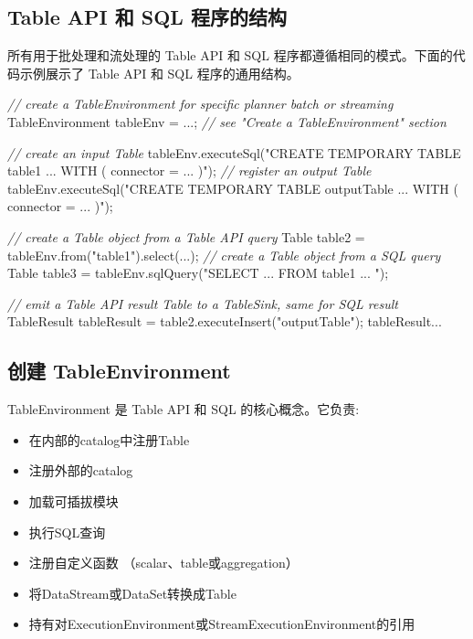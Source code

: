 \documentclass[cn,11pt,chinese]{elegantbook}
\newenvironment{Shaded}{}{}
\newcommand{\CommentTok}[1]{\textcolor[rgb]{0.38,0.63,0.69}{\textit{#1}}}
\newcommand{\FunctionTok}[1]{\textcolor[rgb]{0.02,0.16,0.49}{#1}}
\newcommand{\NormalTok}[1]{#1}
\newcommand{\StringTok}[1]{\textcolor[rgb]{0.25,0.44,0.63}{#1}}
\providecommand{\tightlist}{%
  \setlength{\itemsep}{0pt}\setlength{\parskip}{0pt}}
\begin{document}
\hypertarget{table-api-ux548c-sql-ux7a0bux5e8fux7684ux7ed3ux6784}{%
\subsection{Table API 和 SQL
程序的结构}\label{table-api-ux548c-sql-ux7a0bux5e8fux7684ux7ed3ux6784}}

所有用于批处理和流处理的 Table API 和 SQL
程序都遵循相同的模式。下面的代码示例展示了 Table API 和 SQL
程序的通用结构。

\begin{Shaded}
\begin{Highlighting}[]
\CommentTok{// create a TableEnvironment for specific planner batch or streaming}
\NormalTok{TableEnvironment tableEnv = ...; }\CommentTok{// see "Create a TableEnvironment" section}

\CommentTok{// create an input Table}
\NormalTok{tableEnv.}\FunctionTok{executeSql}\NormalTok{(}\StringTok{"CREATE TEMPORARY TABLE table1 ... WITH ( \textquotesingle{}connector\textquotesingle{} = ... )"}\NormalTok{);}
\CommentTok{// register an output Table}
\NormalTok{tableEnv.}\FunctionTok{executeSql}\NormalTok{(}\StringTok{"CREATE TEMPORARY TABLE outputTable ... WITH ( \textquotesingle{}connector\textquotesingle{} = ... )"}\NormalTok{);}

\CommentTok{// create a Table object from a Table API query}
\NormalTok{Table table2 = tableEnv.}\FunctionTok{from}\NormalTok{(}\StringTok{"table1"}\NormalTok{).}\FunctionTok{select}\NormalTok{(...);}
\CommentTok{// create a Table object from a SQL query}
\NormalTok{Table table3 = tableEnv.}\FunctionTok{sqlQuery}\NormalTok{(}\StringTok{"SELECT ... FROM table1 ... "}\NormalTok{);}

\CommentTok{// emit a Table API result Table to a TableSink, same for SQL result}
\NormalTok{TableResult tableResult = table2.}\FunctionTok{executeInsert}\NormalTok{(}\StringTok{"outputTable"}\NormalTok{);}
\NormalTok{tableResult...}
\end{Highlighting}
\end{Shaded}

\hypertarget{ux521bux5efa-tableenvironment}{%
\subsection{创建 TableEnvironment}\label{ux521bux5efa-tableenvironment}}

TableEnvironment 是 Table API 和 SQL 的核心概念。它负责:

\begin{itemize}
\tightlist
\item
  在内部的catalog中注册Table
\item
  注册外部的catalog
\item
  加载可插拔模块
\item
  执行SQL查询
\item
  注册自定义函数 （scalar、table或aggregation）
\item
  将DataStream或DataSet转换成Table
\item
  持有对ExecutionEnvironment或StreamExecutionEnvironment的引用
\end{itemize}
\end{document}

